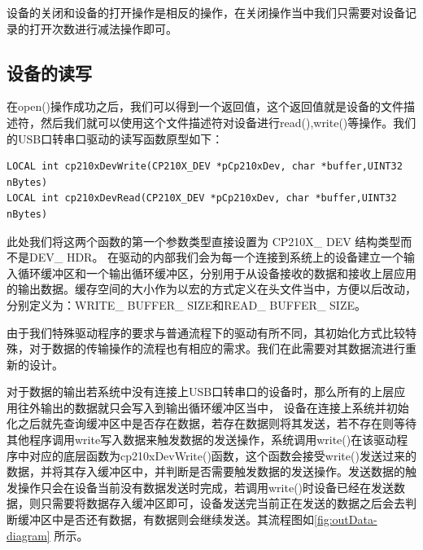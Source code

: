 	设备的关闭和设备的打开操作是相反的操作，在关闭操作当中我们只需要对设备记录的打开次数进行减法操作即可。

\subsection{设备的读写}
	在open()操作成功之后，我们可以得到一个返回值，这个返回值就是设备的文件描述符，然后我们就可以使用这个文件描述符对设备进行read(),write()等操作。我们的USB口转串口驱动的读写函数原型如下：

\lstset{language=C}
\begin{lstlisting}
LOCAL int cp210xDevWrite(CP210X_DEV *pCp210xDev, char *buffer,UINT32 nBytes)
LOCAL int cp210xDevRead(CP210X_DEV *pCp210xDev, char *buffer,UINT32 nBytes)
\end{lstlisting}

此处我们将这两个函数的第一个参数类型直接设置为 CP210X\_ DEV 结构类型而不是DEV\_ HDR。
	在驱动的内部我们会为每一个连接到系统上的设备建立一个输入循环缓冲区和一个输出循环缓冲区，分别用于从设备接收的数据和接收上层应用的输出数据。缓存空间的大小作为以宏的方式定义在头文件当中，方便以后改动，分别定义为：WRITE\_ BUFFER\_ SIZE和READ\_ BUFFER\_ SIZE。
	
	由于我们特殊驱动程序的要求与普通流程下的驱动有所不同，其初始化方式比较特殊，对于数据的传输操作的流程也有相应的需求。我们在此需要对其数据流进行重新的设计。
	
	对于数据的输出若系统中没有连接上USB口转串口的设备时，那么所有的上层应用往外输出的数据就只会写入到输出循环缓冲区当中，	
	设备在连接上系统并初始化之后就先查询缓冲区中是否存在数据，若存在数据则将其发送，若不存在则等待其他程序调用write写入数据来触发数据的发送操作，系统调用write()在该驱动程序中对应的底层函数为cp210xDevWrite()函数，这个函数会接受write()发送过来的数据，并将其存入缓冲区中，并判断是否需要触发数据的发送操作。发送数据的触发操作只会在设备当前没有数据发送时完成，若调用write()时设备已经在发送数据，则只需要将数据存入缓冲区即可，设备发送完当前正在发送的数据之后会去判断缓冲区中是否还有数据，有数据则会继续发送。其流程图如\autoref{fig:outData-diagram} 所示。

